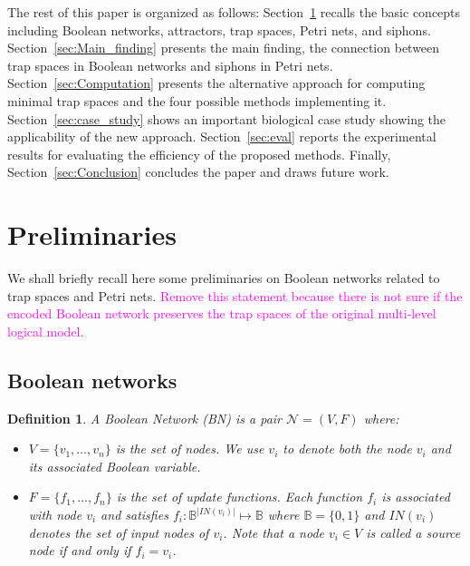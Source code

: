 \documentclass[preprint,12pt]{elsarticle}
\newtheorem{definition}{Definition}[section]
\newcommand{\vangiang}[1]{\textcolor{magenta}{#1}}
\begin{document}
The rest of this paper is organized as follows: Section~\ref{sec:Preliminaries} recalls the basic concepts including Boolean networks, attractors, trap spaces, Petri nets, and siphons.
Section~\ref{sec:Main_finding} presents the main finding, the connection between trap spaces in Boolean networks and siphons in Petri nets.
Section~\ref{sec:Computation} presents the alternative approach for computing minimal trap spaces and the four possible methods implementing it.
Section~\ref{sec:case_study} shows an important biological case study showing the applicability of the new approach.
Section~\ref{sec:eval} reports the experimental results for evaluating the efficiency of the proposed methods.
Finally, Section~\ref{sec:Conclusion} concludes the paper and draws future work.

\section{Preliminaries}
\label{sec:Preliminaries}

We shall briefly recall here some preliminaries on Boolean networks related to trap spaces and Petri nets.
\vangiang{Remove this statement because there is not sure if the encoded Boolean network preserves the trap spaces of the original multi-level logical model.}

\subsection{Boolean networks}

\begin{definition}

  A Boolean Network (BN) is a pair \(\mathcal{N} = (V, F)\) where:
  \begin{itemize}
    \item \(V = \{v_1, \dots, v_n\}\) is the set of nodes.
    We use \(v_i\) to denote both the node \(v_i\) and its associated Boolean variable.
    
    \item \(F = \{f_1, \dots, f_n\}\) is the set of update functions.
    Each function \(f_i\) is associated with node \(v_i\) and satisfies \(f_i \colon \mathbb{B}^{\vert IN(v_i)\vert} \mapsto \mathbb{B}\) where \(\mathbb{B} = \{0, 1\}\) and \(IN(v_i)\) denotes the set of input nodes of \(v_i\).
    Note that a node \(v_i \in V\) is called a \emph{source} node if and only if \(f_{i} = v_i\).
  \end{itemize}

\label{def:BN}
\end{definition}
\end{document}
